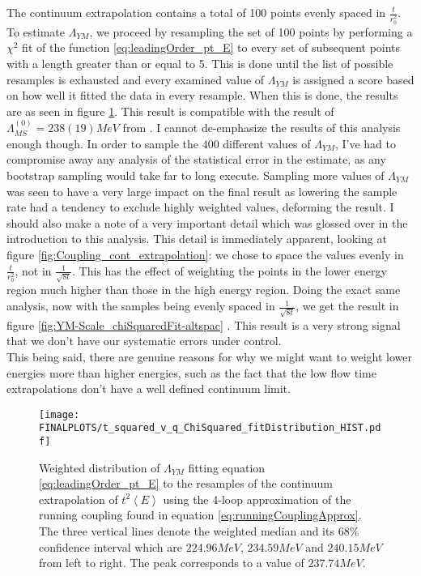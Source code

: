 \documentclass[a4paper,10pt]{book}
\begin{document}
The continuum extrapolation contains a total of 100 points evenly spaced in $\frac{t}{r_0^2}$. To estimate $\Lambda_{YM}$, we proceed by resampling the set of 100 points by performing a $\chi^2$ fit of the function \eqref{eq:leadingOrder_pt_E} to every set of subsequent points with a length greater than or equal to 5. This is done until the list of possible resamples is exhausted and every examined value of $\Lambda_{YM}$ is assigned a score based on how well it fitted the data in every resample. When this is done, the results are as seen in figure \ref{fig:YM-Scale_chiSquaredFit}. This result is compatible with the result of $\Lambda^{(0)}_{MS} = 238(19)MeV$ from \cite{CapitaniStefano1999Nqmr}. I cannot de-emphasize the results of this analysis enough though. In order to sample the $400$ different values of $\Lambda_{YM}$, I've had to compromise away any analysis of the statistical error in the estimate, as any bootstrap sampling would take far to long execute. Sampling more values of $\Lambda_{YM}$ was seen to have a very large impact on the final result as lowering the sample rate had a tendency to exclude highly weighted values, deforming the result. I should also make a note of a very important detail which was glossed over in the introduction to this analysis. This detail is immediately apparent, looking at figure \ref{fig:Coupling_cont_extrapolation}: we chose to space the values evenly in $\frac{t}{r_0^2}$, not in $\frac{1}{\sqrt{8t}}$. This has the effect of weighting the points in the lower energy region much higher than those in the high energy region. Doing the exact same analysis, now with the samples being evenly spaced in $\frac{1}{\sqrt{8t}}$, we get the result in figure \ref{fig:YM-Scale_chiSquaredFit-altspac} .
This result is a very strong signal that we don't have our systematic errors under control.\\This being said, there are genuine reasons for why we might want to weight lower energies more than higher energies, such as the fact that the low flow time extrapolations don't have a well defined continuum limit. 


\begin{figure}[htbp]
\centering
\texttt{[image: FINALPLOTS/t\_squared\_v\_q\_ChiSquared\_fitDistribution\_HIST.pdf]}
\caption[]{Weighted distribution of $\Lambda_{YM}$ fitting equation \eqref{eq:leadingOrder_pt_E} to the resamples of the continuum extrapolation of $t^2\left\langle E\right\rangle $ using the 4-loop approximation of the running coupling found in equation \eqref{eq:runningCouplingApprox}. The three vertical lines denote the weighted median and its $68\%$ confidence interval which are $224.96MeV$, $234.59MeV$ and $240.15MeV$ from left to right. The peak corresponds to a value of $237.74MeV$.}\label{fig:YM-Scale_chiSquaredFit}
\end{figure}
\end{document}

